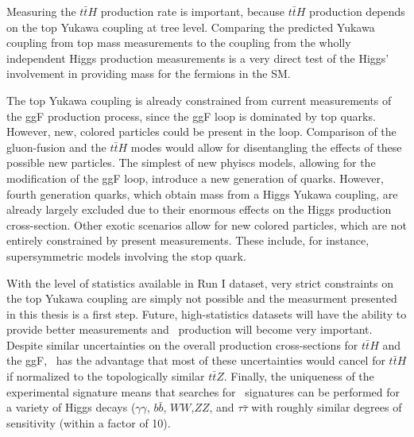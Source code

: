 Measuring the $t\bar{t}H$ production rate is important, because
$t\bar{t}H$ production depends on the top Yukawa coupling at tree level. Comparing
the predicted Yukawa coupling from top mass measurements to the coupling from
the wholly independent Higgs production measurements is a very direct 
test of the Higgs' involvement in providing mass for the fermions in the SM.

The top Yukawa coupling is already constrained from current measurements of the ggF production
process, since the ggF loop is dominated by top quarks. However, new, colored particles could be
present in the loop. Comparison of the gluon-fusion and the $t\bar{t}H$
modes would allow for disentangling the effects of these possible new particles\cite{Dawson:2013bba}. 
The simplest of new phyiscs models, allowing for the modification
of the ggF loop, introduce a new generation of quarks. However, fourth
generation quarks, which obtain mass from a Higgs Yukawa coupling, are already
largely excluded due to their enormous effects on the Higgs production
cross-section\cite{Eberhardt:2012gv}. Other exotic scenarios allow for new colored particles, 
which are not entirely constrained by present measurements\cite{Carena:2013iba,ArkaniHamed:2012kq,Carmi:2012yp}.
These include, for instance, supersymmetric models involving the stop quark.  

With the level of statistics available in Run I dataset, very strict constraints on the top 
Yukawa coupling are simply not possible and the measurment presented in this 
thesis is a first step. Future, high-statistics datasets will have the ability to provide 
better measurements and \tth\ production will become very important.
Despite similar uncertainties on the overall production cross-sections for $t\bar{t}H$ and the ggF,
\tth\ has the advantage that most of these uncertainties would cancel for $t\bar{t}H$ if normalized to the topologically similar $t\bar{t}Z$.  Finally, the uniqueness of the experimental signature means that
searches for \tth\ signatures can be performed for a variety of Higgs decays ($\gamma\gamma$, $b\bar{b}$,
$WW$,$ZZ$, and $\tau\bar{\tau}$ with roughly similar degrees of sensitivity (within a factor of 10)\cite{Dawson:2013bba}. 



